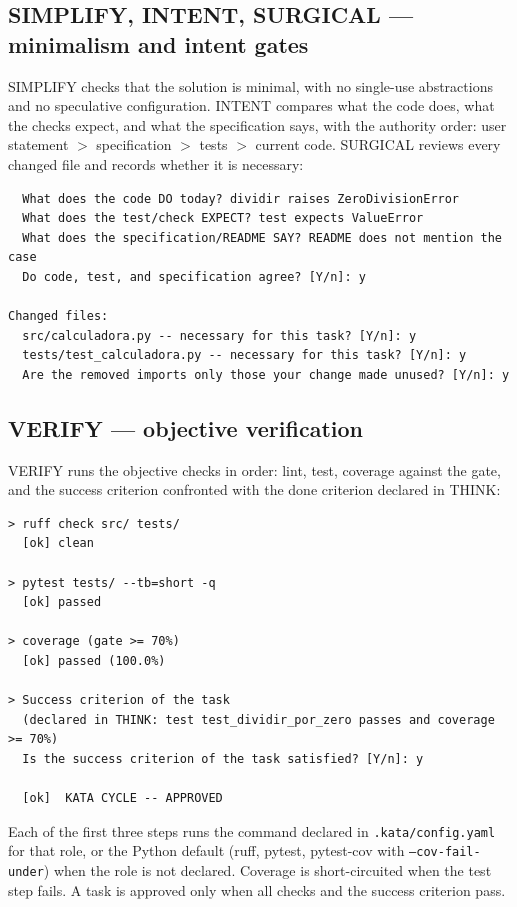 \documentclass[11pt]{article}
\begin{document}
\subsection{SIMPLIFY, INTENT, SURGICAL --- minimalism and intent gates}

SIMPLIFY checks that the solution is minimal, with no single-use
abstractions and no speculative configuration. INTENT compares what the code
does, what the checks expect, and what the specification says, with the
authority order: user statement $>$ specification $>$ tests $>$ current
code. SURGICAL reviews every changed file and records whether it is
necessary:

\begin{lstlisting}
  What does the code DO today? dividir raises ZeroDivisionError
  What does the test/check EXPECT? test expects ValueError
  What does the specification/README SAY? README does not mention the case
  Do code, test, and specification agree? [Y/n]: y

Changed files:
  src/calculadora.py -- necessary for this task? [Y/n]: y
  tests/test_calculadora.py -- necessary for this task? [Y/n]: y
  Are the removed imports only those your change made unused? [Y/n]: y
\end{lstlisting}

\subsection{VERIFY --- objective verification}

VERIFY runs the objective checks in order: lint, test, coverage against the
gate, and the success criterion confronted with the done criterion declared
in THINK:

\begin{lstlisting}
> ruff check src/ tests/
  [ok] clean

> pytest tests/ --tb=short -q
  [ok] passed

> coverage (gate >= 70%)
  [ok] passed (100.0%)

> Success criterion of the task
  (declared in THINK: test test_dividir_por_zero passes and coverage >= 70%)
  Is the success criterion of the task satisfied? [Y/n]: y

  [ok]  KATA CYCLE -- APPROVED
\end{lstlisting}

Each of the first three steps runs the command declared in
\texttt{.kata/config.yaml} for that role, or the Python default (ruff,
pytest, pytest-cov with \texttt{--cov-fail-under}) when the role is not
declared. Coverage is short-circuited when the test step fails. A task is
approved only when all checks and the success criterion pass.
\end{document}
